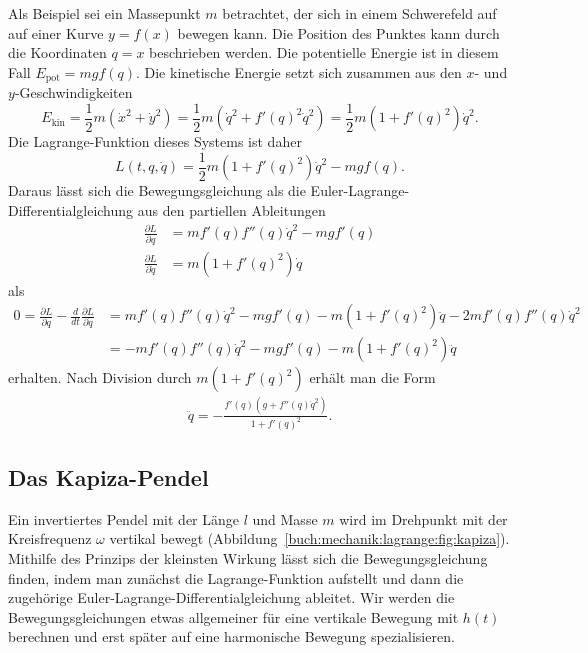 Als Beispiel sei ein Massepunkt $m$ betrachtet, der sich in einem
Schwerefeld auf auf einer Kurve $y=f(x)$ bewegen kann.
Die Position des Punktes kann durch die Koordinaten $q=x$ beschrieben
werden.
Die potentielle Energie ist in diesem Fall $E_{\text{pot}} = mgf(q)$.
Die kinetische Energie setzt sich zusammen aus den $x$- und
$y$-Geschwindigkeiten
\[
E_{\text{kin}}
=
\frac12m(\dot{x}^2 + \dot{y}^2)
=
\frac12m(\dot{q}^2 + f'(q)^2 \dot{q}^2)
=
\frac12m(1+f'(q)^2)\dot{q}^2.
\]
Die Lagrange-Funktion dieses Systems ist daher 
\[
L(t,q,\dot{q})
=
\frac12m(1+f'(q)^2)\dot{q}^2 - mgf(q).
\]
Daraus lässt sich die Bewegungsgleichung als die
Euler-Lagrange-Differentialgleichung aus den partiellen Ableitungen
\begin{align*}
\frac{\partial L}{\partial q}
&=
mf'(q)f''(q)\dot{q}^2 - mgf'(q)
\\
\frac{\partial L}{\partial\dot{q}}
&=
m(1+f'(q)^2)\dot{q}
\end{align*}
als
\begin{align*}
0
=
\frac{\partial L}{\partial q}-\frac{d}{dt}\frac{\partial L}{\partial\dot{q}}
&=
mf'(q)f''(q)\dot{q}^2
-
mgf'(q)
-
m(1+f'(q)^2)\ddot{q}
-
2mf'(q)f''(q)\dot{q}^2
\\
&=
-
mf'(q)f''(q)\dot{q}^2
-
mgf'(q)
-
m(1+f'(q)^2)\ddot{q}
\end{align*}
erhalten.
Nach Division durch $m(1+f'(q)^2)$ erhält man die Form
\begin{align*}
\ddot{q}
=
-
\frac{f'(q)(g+f''(q)\dot{q}^2)}{1+f'(q)^2}.
\end{align*}


%
%
\subsection{Das Kapiza-Pendel
\label{buch:mechanik:lagrange:subsection:kapiza}}

%
Ein invertiertes Pendel mit der Länge $l$ und Masse $m$ wird im
Drehpunkt mit der Kreisfrequenz $\omega$ vertikal bewegt
(Abbildung~\ref{buch:mechanik:lagrange:fig:kapiza}).
Mithilfe des Prinzips der kleinsten Wirkung lässt sich die
Bewegungsgleichung finden, indem man zunächst die Lagrange-Funktion
aufstellt und dann die zugehörige Euler-Lagrange-Differentialgleichung
ableitet.
Wir werden die Bewegungsgleichungen etwas allgemeiner für eine
vertikale Bewegung mit $h(t)$ berechnen und erst später auf eine
harmonische Bewegung spezialisieren.

